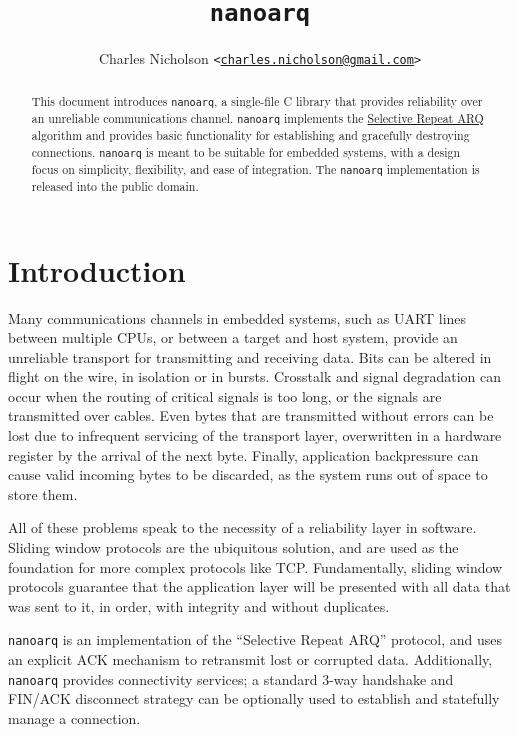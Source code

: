 \documentclass[11pt]{article}
\newcommand{\nanoarq}{\texttt{nanoarq}}
\begin{document}
\title{\nanoarq{}}
\author{Charles Nicholson \texttt{<\href{mailto:charles.nicholson@gmail.com}{charles.nicholson@gmail.com}>}}
\date{}
\maketitle

\begin{abstract}
    This document introduces \nanoarq{}, a single-file C library that provides reliability over an unreliable communications channel. \nanoarq{} implements the \href{https://en.wikipedia.org/wiki/Selective_Repeat_ARQ}{Selective Repeat ARQ}   algorithm and provides basic functionality for establishing and gracefully destroying connections. \nanoarq{} is meant to be suitable for embedded systems, with a design focus on simplicity, flexibility, and ease of integration. The \nanoarq{} implementation is released into the public domain.
\end{abstract}

\section{Introduction}
Many communications channels in embedded systems, such as UART lines between multiple CPUs, or between a target and host system, provide an unreliable transport for transmitting and receiving data. Bits can be altered in flight on the wire, in isolation or in bursts. Crosstalk and signal degradation can occur when the routing of critical signals is too long, or the signals are transmitted over cables. Even bytes that are transmitted without errors can be lost due to infrequent servicing of the transport layer, overwritten in a hardware register by the arrival of the next byte. Finally, application backpressure can cause valid incoming bytes to be discarded, as the system runs out of space to store them. \par
All of these problems speak to the necessity of a reliability layer in software. Sliding window protocols are the ubiquitous solution, and are used as the foundation for more complex protocols like TCP. Fundamentally, sliding window protocols guarantee that the application layer will be presented with all data that was sent to it, in order, with integrity and without duplicates. \par
\nanoarq{} is an implementation of the \enquote{Selective Repeat ARQ} protocol, and uses an explicit ACK mechanism to retransmit lost or corrupted data. Additionally, \nanoarq{} provides connectivity services; a standard 3-way handshake and FIN/ACK disconnect strategy can be optionally used to establish and statefully manage a connection.
\end{document}
